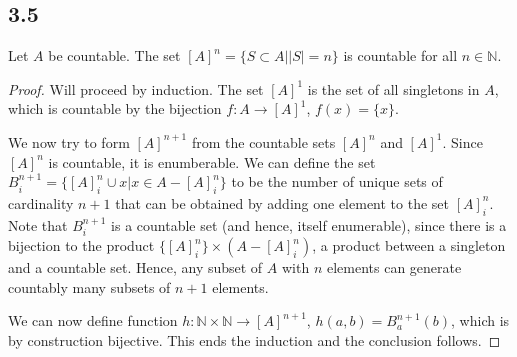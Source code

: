 \subsection*{3.5}

Let $A$ be countable. The set $[A]^n = \{S \subset A | |S|=n \}$ is countable for all $n\in\mathbb{N}$.

\begin{proof}
Will proceed by induction. The set $[A]^1$ is the set of all singletons in $A$, which is countable by the bijection $f:A\rightarrow [A]^1$, $f(x) = \{x\}$.

We now try to form $[A]^{n+1}$ from the countable sets $[A]^n$ and $[A]^1$. Since $[A]^n$ is countable, it is enumberable. We can define the set $B^{n+1}_i = \{[A]^n_i \cup x | x \in A - [A]^n_i\}$ to be the number of unique sets of cardinality $n+1$ that can be obtained by adding one element to the set $[A]^n_i$. Note that $B^{n+1}_i$ is a countable set (and hence, itself enumerable), since there is a bijection to the product $\{[A]^n_{i}\} \times (A - [A]^n_i)$, a product between a singleton and a countable set. Hence, any subset of $A$ with $n$ elements can generate countably many subsets of $n+1$ elements. 

We can now define function $h: \mathbb{N} \times \mathbb{N} \rightarrow [A]^{n+1}$, $h(a, b) = B^{n+1}_a(b)$, which is by construction bijective. This ends the induction and the conclusion follows.
\end{proof}

